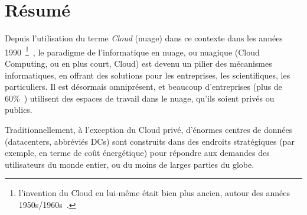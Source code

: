 
\part*{Résumé}
\label{p:resume}







Depuis l'utilisation du terme \emph{Cloud} (nuage) dans ce contexte
dans les années 1990~\footnote{l'invention du Cloud en lui-même était
  bien plus ancien, autour des années
  1950s/1960s~\cite{history}.}~\cite{what-is-the-cloud,history-cloud},
le paradigme de l'informatique en nuage, ou nuagique (Cloud Computing,
ou en plus court, Cloud) est devenu un pilier des mécanismes
informatiques, en offrant des solutions pour les entreprises, les
scientifiques, les particuliers.
%
Il est désormais omniprésent, et beaucoup d'entreprises (plus de
60\%~\cite{stats}) utilisent des espaces de travail dans le nuage,
qu'ils soient privés ou publics.

Traditionnellement, à l'exception du Cloud privé, d'énormes centres de
données (datacenters, abbréviés DCs) sont construits dans des endroits
stratégiques (par exemple, en terme de coût énergétique) pour répondre
aux demandes des utilisateurs du monde entier, ou du moins de larges
parties du globe.



